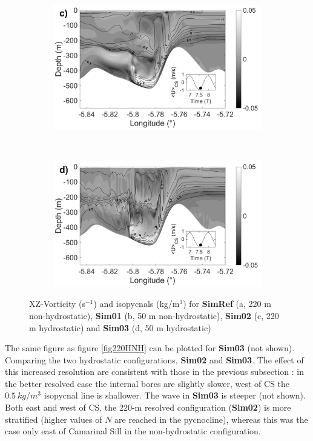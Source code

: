 \begin{figure}[!h]
  \begin{subfigure}{0.5\linewidth}
  \includegraphics[width=\textwidth]{./papier2D/RV_75T_220mH.png}
  \end{subfigure}
  ~
  \begin{subfigure}{0.5\linewidth}
  \includegraphics[width=\textwidth]{./papier2D/RV_75T_50mH.png}
  \end{subfigure}
  \caption{XZ-Vorticity (s$^{-1}$) and isopycnals (kg/m$^3$) for \textbf{SimRef} (a, 220 m non-hydrostatic), \textbf{Sim01} (b, 50 m non-hydrostatic), \textbf{Sim02} (c, 220 m hydrostatic) and \textbf{Sim03} (d, 50 m hydrostatic)}
  \label{figvortCS}
\end{figure}

The same figure as figure \ref{fig220HNH} can be plotted for \textbf{Sim03} (not shown). Comparing the two hydrostatic configurations, \textbf{Sim02} and \textbf{Sim03}. The effect of this increased resolution are consistent with those in the previous subsection : in the better resolved case the internal bores are slightly slower, west of CS the $0.5\ kg/m^3$ isopycnal line is shallower. The wave in \textbf{Sim03} is steeper (not shown). Both east and west of CS, the 220-m resolved configuration (\textbf{Sim02}) is more stratified (higher values of $N$ are reached in the pycnocline), whereas this was the case only east of Camarinal Sill in the non-hydrostatic configuration.

